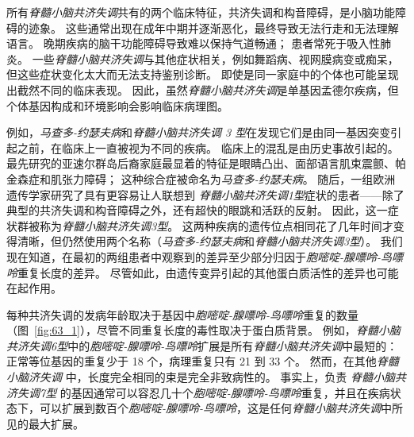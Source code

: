 所有\textit{脊髓小脑共济失调}共有的两个临床特征，共济失调和构音障碍，是小脑功能障碍的迹象。
这些通常出现在成年中期并逐渐恶化，最终导致无法行走和无法理解语言。
晚期疾病的脑干功能障碍导致难以保持气道畅通；
患者常死于吸入性肺炎。
一些\textit{脊髓小脑共济失调}与其他症状相关，例如舞蹈病、视网膜病变或痴呆，但这些症状变化太大而无法支持鉴别诊断。
即使是同一家庭中的个体也可能呈现出截然不同的临床表现。
因此，虽然\textit{脊髓小脑共济失调}是单基因孟德尔疾病，但个体基因构成和环境影响会影响临床病理图。


例如，\textit{马查多-约瑟夫病}和\textit{脊髓小脑共济失调 3 型}在发现它们是由同一基因突变引起之前，在临床上一直被视为不同的疾病。
临床上的混乱是由历史事故引起的。
最先研究的亚速尔群岛后裔家庭最显着的特征是眼睛凸出、面部语言肌束震颤、帕金森症和肌张力障碍；
这种综合症被命名为\textit{马查多-约瑟夫病}。
随后，一组欧洲遗传学家研究了具有更容易让人联想到 \textit{脊髓小脑共济失调1型}症状的患者——除了典型的共济失调和构音障碍之外，还有超快的眼跳和活跃的反射。
因此，这一症状群被称为\textit{脊髓小脑共济失调3型}。
这两种疾病的遗传位点相同花了几年时间才变得清晰，但仍然使用两个名称（\textit{马查多-约瑟夫病}和\textit{脊髓小脑共济失调3型}）。
我们现在知道，在最初的两组患者中观察到的差异至少部分归因于\textit{胞嘧啶-腺嘌呤-鸟嘌呤}重复长度的差异。
尽管如此，由遗传变异引起的其他蛋白质活性的差异也可能在起作用。


每种共济失调的发病年龄取决于基因中\textit{胞嘧啶-腺嘌呤-鸟嘌呤}重复的数量（图~\ref{fig:63_1}），尽管不同重复长度的毒性取决于蛋白质背景。
例如，\textit{脊髓小脑共济失调6型}中的\textit{胞嘧啶-腺嘌呤-鸟嘌呤}扩展是所有\textit{脊髓小脑共济失调}中最短的：正常等位基因的重复少于 18 个，病理重复只有 21 到 33 个。
然而，在其他\textit{脊髓小脑济失调} 中，长度完全相同的束是完全非致病性的。
事实上，负责 \textit{脊髓小脑共济失调7型} 的基因通常可以容忍几十个\textit{胞嘧啶-腺嘌呤-鸟嘌呤}重复，并且在疾病状态下，可以扩展到数百个\textit{胞嘧啶-腺嘌呤-鸟嘌呤}，这是任何\textit{脊髓小脑共济失调}中所见的最大扩展。



